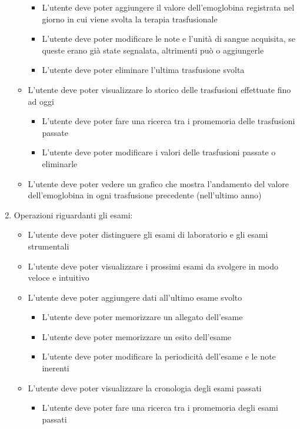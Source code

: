 \documentclass[12pt,a4paper,openright,twoside]{report}
\begin{document}
\begin{enumerate}
\begin{itemize}
        \begin{itemize}
        \item L'utente deve poter aggiungere il valore dell'emoglobina registrata nel giorno in cui viene svolta la terapia trasfusionale
        \item L'utente deve poter modificare le note e l'unità di sangue acquisita, se queste erano già state segnalata, altrimenti può o aggiungerle
        \item L'utente deve poter eliminare l'ultima trasfusione svolta
        \end{itemize}
        \item L'utente deve poter visualizzare lo storico delle trasfusioni effettuate fino ad oggi
        \begin{itemize}
        \item L'utente deve poter fare una ricerca tra i promemoria delle trasfusioni passate
        \item L'utente deve poter modificare i valori delle trasfusioni passate o eliminarle
        \end{itemize}
        \item L'utente deve poter vedere un grafico che mostra l'andamento del valore dell'emoglobina in ogni trasfusione precedente (nell'ultimo anno)
        \end{itemize}
        \item Operazioni riguardanti gli esami:
        \begin{itemize}
        \item L'utente deve poter distinguere gli esami di laboratorio e gli esami strumentali
        \item L'utente deve poter visualizzare i prossimi esami da svolgere in modo veloce e intuitivo
        \item L'utente deve poter aggiungere dati all'ultimo esame svolto
        \begin{itemize}
        \item L'utente deve poter memorizzare un allegato dell'esame
        \item L'utente deve poter memorizzare un esito dell'esame
        \item L'utente deve poter modificare la periodicità dell'esame e le note inerenti
        \end{itemize}
        \item L'utente deve poter visualizzare la cronologia degli esami passati
        \begin{itemize}
        \item L'utente deve poter fare una ricerca tra i promemoria degli esami passati

\end{itemize}
\end{itemize}
\end{enumerate}
\end{document}

